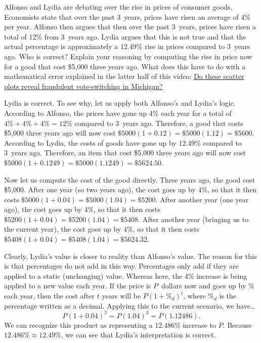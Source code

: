 \documentclass[11pt,letterpaper]{article}
\begin{document}


 Alfonso and Lydia are debating over the rise in prices of consumer goods. Economists state that over the past 3~years, prices have risen an average of 4\% per year. Alfonso then argues that then over the past 3~years, prices have risen a total of 12\% from 3~years ago. Lydia argues that this is not true and that the actual percentage is approximately a 12.49\% rise in prices compared to 3~years ago. Who is correct? Explain your reasoning by computing the rise in price now for a good that cost \$5,000 three years ago. What does this have to do with a mathematical error explained in the latter half of this video: \href{https://www.youtube.com/watch?v=aokNwKx7gM8&ab_channel=Stand-upMaths}{Do these scatter plots reveal fraudulent vote-switching in Michigan?} \pspace

\sol Lydia is correct. To see why, let us apply both Alfonso's and Lydia's logic. According to Alfonso, the prices have gone up 4\% each year for a total of $4\% + 4\% + 4\%= 12\%$ compared to 3~years ago. Therefore, a good that costs \$5,000 three years ago will now cost $\$5000(1 + 0.12)= \$5000(1.12)= \$5600$. According to Lydia, the costs of goods have gone up by 12.49\% compared to 3~years ago. Therefore, an item that cost \$5,000 three years ago will now cost $\$5000(1 + 0.1249)= \$5000(1.1249)= \$5624.50$. \pspace

Now let us compute the cost of the good directly. Three years ago, the good cost \$5,000. After one year (so two years ago), the cost goes up by 4\%, so that it then costs $\$5000(1 + 0.04)= \$5000(1.04)= \$5200$. After another year (one year ago), the cost goes up by 4\%, so that it then costs $\$5200(1 + 0.04)= \$5200(1.04)= \$5408$. After another year (bringing us to the current year), the cost goes up by 4\%, so that it then costs $\$5408(1 + 0.04)= \$5408(1.04)= \$5624.32$. \pspace

Clearly, Lydia's value is closer to reality than Alfonso's value. The reason for this is that percentages do not add in this way. Percentages only add if they are applied to a static (unchanging) value. Whereas here, the 4\% increase is being applied to a new value each year. If the price is $P$~dollars now and goes up by \% each year, then the cost after $t$ years will be $P(1 + \%_d)^t$, where $\%_d$ is the percentage written as a decimal. Applying this to the current scenario, we have\dots \pspace
	\[
	P(1 + 0.04)^3= P(1.04)^3= P(1.12486).
	\] \pspace
We can recognize this product as representing a 12.486\% increase to $P$. Because $12.486\% \approx 12.49\%$, we can see that Lydia's interpretation is correct. \pspace
\end{document}
